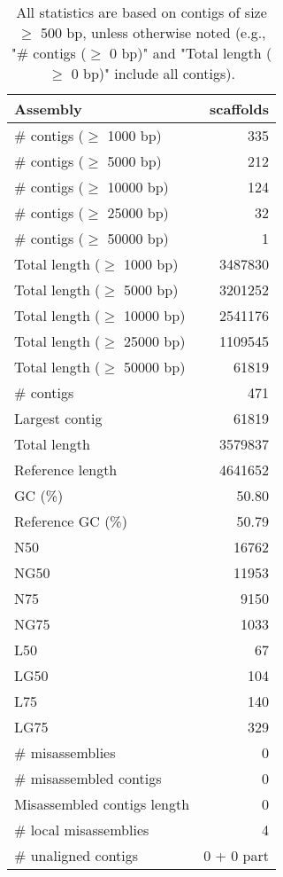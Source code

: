 \documentclass[12pt,a4paper]{article}
\begin{document}
\begin{table}[ht]
\begin{center}
\caption{All statistics are based on contigs of size $\geq$ 500 bp, unless otherwise noted (e.g., "\# contigs ($\geq$ 0 bp)" and "Total length ($\geq$ 0 bp)" include all contigs).}
\begin{tabular}{|l*{1}{|r}|}
\hline
Assembly & scaffolds \\ \hline
\# contigs ($\geq$ 1000 bp) & 335 \\ \hline
\# contigs ($\geq$ 5000 bp) & 212 \\ \hline
\# contigs ($\geq$ 10000 bp) & 124 \\ \hline
\# contigs ($\geq$ 25000 bp) & 32 \\ \hline
\# contigs ($\geq$ 50000 bp) & 1 \\ \hline
Total length ($\geq$ 1000 bp) & 3487830 \\ \hline
Total length ($\geq$ 5000 bp) & 3201252 \\ \hline
Total length ($\geq$ 10000 bp) & 2541176 \\ \hline
Total length ($\geq$ 25000 bp) & 1109545 \\ \hline
Total length ($\geq$ 50000 bp) & 61819 \\ \hline
\# contigs & 471 \\ \hline
Largest contig & 61819 \\ \hline
Total length & 3579837 \\ \hline
Reference length & 4641652 \\ \hline
GC (\%) & 50.80 \\ \hline
Reference GC (\%) & 50.79 \\ \hline
N50 & 16762 \\ \hline
NG50 & 11953 \\ \hline
N75 & 9150 \\ \hline
NG75 & 1033 \\ \hline
L50 & 67 \\ \hline
LG50 & 104 \\ \hline
L75 & 140 \\ \hline
LG75 & 329 \\ \hline
\# misassemblies & 0 \\ \hline
\# misassembled contigs & 0 \\ \hline
Misassembled contigs length & 0 \\ \hline
\# local misassemblies & 4 \\ \hline
\# unaligned contigs & 0 + 0 part \\ \hline

\end{tabular}
\end{center}
\end{table}
\end{document}
